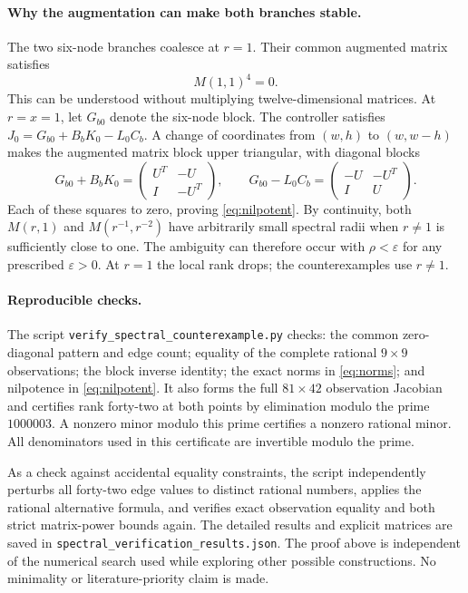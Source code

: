 \documentclass[11pt,a4paper]{article}
\begin{document}
\paragraph{Why the augmentation can make both branches stable.}
The two six-node branches coalesce at $r=1$. Their common augmented matrix
satisfies
\begin{equation}\label{eq:nilpotent}
 M(1,1)^4=0.
\end{equation}
This can be understood without multiplying twelve-dimensional matrices.
At $r=x=1$, let $G_{b0}$ denote the six-node block. The controller satisfies
$J_0=G_{b0}+B_bK_0-L_0C_b$. A change of coordinates from $(w,h)$ to
$(w,w-h)$ makes the augmented matrix block upper triangular, with diagonal
blocks
\[
 G_{b0}+B_bK_0=\begin{pmatrix}U^T&-U\\I&-U^T\end{pmatrix},\qquad
 G_{b0}-L_0C_b=\begin{pmatrix}-U&-U^T\\I&U\end{pmatrix}.
\]
Each of these squares to zero, proving \eqref{eq:nilpotent}. By continuity,
both $M(r,1)$ and $M(r^{-1},r^{-2})$ have arbitrarily small spectral radii
when $r\ne1$ is sufficiently close to one. The ambiguity can therefore
occur with $\rho<\varepsilon$ for any prescribed $\varepsilon>0$.
At $r=1$ the local rank drops; the counterexamples use $r\ne1$.

\paragraph{Reproducible checks.}
The script \texttt{verify\_spectral\_counterexample.py} checks:
the common zero-diagonal pattern and edge count;
equality of the complete rational $9\times9$ observations;
the block inverse identity;
the exact norms in \eqref{eq:norms}; and nilpotence in \eqref{eq:nilpotent}.
It also forms the full $81\times42$ observation Jacobian and certifies rank
forty-two at both points by elimination modulo the prime $1000003$.
A nonzero minor modulo this prime certifies a nonzero rational minor.
All denominators used in this certificate are invertible modulo the prime.

As a check against accidental equality constraints, the script independently
perturbs all forty-two edge values to distinct rational numbers, applies
the rational alternative formula, and verifies exact observation equality
and both strict matrix-power bounds again. The detailed results and explicit
matrices are saved in \texttt{spectral\_verification\_results.json}.
The proof above is independent of the numerical search used while exploring
other possible constructions. No minimality or literature-priority claim
is made.
\end{document}
